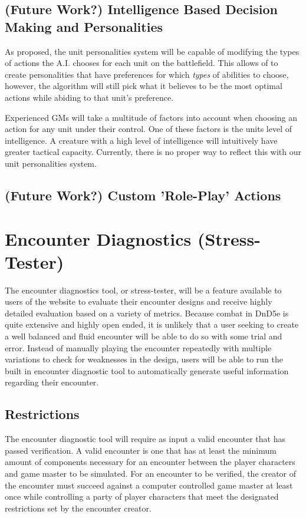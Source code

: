 \documentclass[12pt,a4paper]{report}
\begin{document}
		\subsection{(Future Work?) Intelligence Based Decision Making and Personalities}
		As proposed, the unit personalities system will be capable of modifying the types of actions the A.I. chooses for each unit on the battlefield. This allows of to create personalities that have preferences for which \textit{types} of abilities to choose, however, the algorithm will still pick what it believes to be the most optimal actions while abiding to that unit's preference. 
		
		Experienced GMs will take a multitude of factors into account when choosing an action for any unit under their control. One of these factors is the units level of intelligence. A creature with a high level of intelligence will intuitively have greater tactical capacity. Currently, there is no proper way to reflect this with our unit personalities system. 
		
		
		
		\subsection{(Future Work?) Custom 'Role-Play' Actions}
	
	\section{Encounter Diagnostics (Stress-Tester)}
	The encounter diagnostics tool, or stress-tester, will be a feature available to users of the website to evaluate their encounter designs and receive highly detailed evaluation based on a variety of metrics. Because combat in DnD5e is quite extensive and highly open ended, it is unlikely that a user seeking to create a well balanced and fluid encounter will be able to do so with some trial and error. Instead of manually playing the encounter repeatedly with multiple variations to check for weaknesses in the design, users will be able to run the built in encounter diagnostic tool to automatically generate useful information regarding their encounter. 
	
		\subsection{Restrictions}
		The encounter diagnostic tool will require as input a valid encounter that has passed verification. A valid encounter is one that has at least the minimum amount of components necessary for an encounter between the player characters and game master to be simulated. For an encounter to be verified, the creator of the encounter must succeed against a computer controlled game master at least once while controlling a party of player characters that meet the designated restrictions set by the encounter creator.  
		
\end{document}
